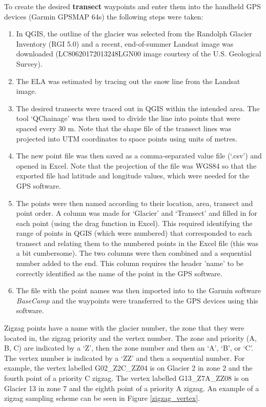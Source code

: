 \documentclass{sfuthesis}
\begin{document}
\begin{appendices}
	To create the desired \textbf{transect} waypoints and enter them into the handheld GPS devices (Garmin GPSMAP 64s) the following steps were taken:
\begin{enumerate}
\item In QGIS, the outline of the glacier was selected from the Randolph Glacier Inventory (RGI 5.0) \citep{Pfeffer2014} and a recent, end-of-summer Landsat image was downloaded (LC80620172013248LGN00 image courtesy of the U.S. Geological Survey). 
\item The ELA was estimated by tracing out the snow line from the Landsat image.
\item The desired transects were traced out in QGIS within the intended area. The tool `QChainage' was then used to divide the line into points that were spaced every 30 m. Note that the shape file of the transect lines was projected into UTM coordinates to space points using units of metres. 
\item The new point file was then saved as a comma-separated value file (`.csv') and opened in Excel. Note that the projection of the file was WGS84 so that the exported file had latitude and longitude values, which were needed for the GPS software.
\item The points were then named according to their location, area, transect and point order. A column was made for `Glacier' and `Transect' and filled in for each point (using the drag function in Excel). This required identifying the range of points in QGIS (which were numbered) that corresponded to each transect and relating them to the numbered points in the Excel file (this was a bit cumbersome). The two columns were then combined and a sequential number added to the end. This column requires the header 'name' to be correctly identified as the name of the point in the GPS software.
\item The file with the point names was then imported into to the Garmin software \textit{BaseCamp} and the waypoints were transferred to the GPS devices using this software. 
\end{enumerate}

Zigzag points have a name with the glacier number, the zone that they were located in, the zigzag priority and the vertex number. The zone and priority (A, B, C) are indicated by a `Z', then the zone number and then an `A', `B', or `C'. The vertex number is indicated by a `ZZ' and then a sequential number. For example, the vertex labelled G02\_Z2C\_ZZ04 is on Glacier 2 in zone 2 and the fourth point of a priority C zigzag. The vertex labelled G13\_Z7A\_ZZ08 is on Glacier 13 in zone 7 and the eighth point of a priority A zigzag. An example of a zigzag sampling scheme can be seen in Figure \ref{zigzag_vertex}.


\end{appendices}
\end{document}

